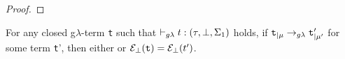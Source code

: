 \begin{proof}
%
 \end{proof}



\theoremstyle{remark}

\begin{lemma}
For any closed g$\lambda$-term \texttt{t} such that
$\typrule{t}{\tau}{\bot}{\Sigma_1}$ holds, 
if	$\texttt{t}_{|\mu} \rightarrow_{g\lambda} \texttt{t}'_{|\mu'}$ 
for some term \texttt{t}', 
then either 
or 		$\mathcal{E}_{\bot}(\texttt{t}) = \mathcal{E}_{\bot}(t')$. 
\end{lemma}


